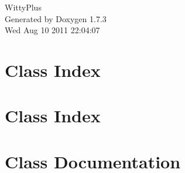 \documentclass[a4paper]{book}
\begin{document}
\hypersetup{pageanchor=false}
\begin{titlepage}
\vspace*{7cm}
\begin{center}
{\Large WittyPlus }\\
\vspace*{1cm}
{\large Generated by Doxygen 1.7.3}\\
\vspace*{0.5cm}
{\small Wed Aug 10 2011 22:04:07}\\
\end{center}
\end{titlepage}
\clearemptydoublepage
{}
\tableofcontents
\clearemptydoublepage
{}
\hypersetup{pageanchor=true}
\chapter{Class Index}

\chapter{Class Index}

\chapter{Class Documentation}














\printindex
\end{document}
